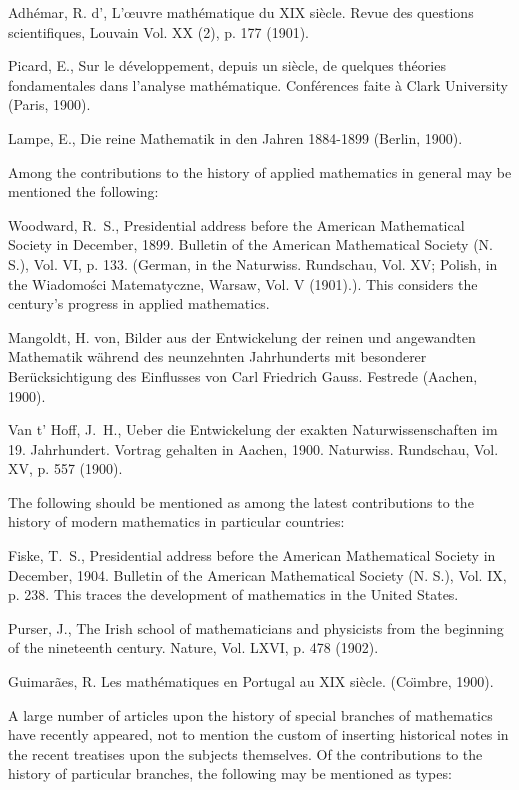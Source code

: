 \documentclass[oneside]{book}
\begin{document}
{Adh\'emar, R. d', L'\oe{}uvre math\'ematique du XIX si\`ecle. Revue
des questions scientifiques, Louvain Vol. XX (2), p. 177 (1901).

Picard, E., Sur le d\'eveloppement, depuis un si\`ecle, de quelques
th\'eories fondamentales dans l'analyse
math\'ematique. Conf\'erences faite \`a Clark University (Paris,
1900).

Lampe, E., Die reine Mathematik in den Jahren 1884-1899 (Berlin,
1900).

\bigskip

Among the contributions to the history of applied mathematics in
general may be mentioned the following:

\bigskip

Woodward, R.~S., Presidential address before the American
Mathematical Society in December, 1899. Bulletin of the American
Mathematical Society (N. S.), Vol. VI, p. 133. (German, in the
Naturwiss. Rundschau, Vol. XV; Polish, in the Wiadomo\'sci
Matematyczne, Warsaw, Vol. V (1901).). This considers the century's
progress in applied mathematics.

Mangoldt, H. von, Bilder aus der Entwickelung der reinen und
angewandten Mathematik w\"ahrend des neunzehnten Jahrhunderts mit
besonderer Ber\"ucksichtigung des Einflusses von Carl Friedrich
Gauss. Festrede (Aachen, 1900).

Van t' Hoff, J.~H., Ueber die Entwickelung der exakten
Naturwissenschaften im 19. Jahrhundert. Vortrag gehalten in Aachen,
1900. Naturwiss. Rundschau, Vol. XV, p. 557 (1900).

\bigskip

The following should be mentioned as among the latest contributions
to the history of modern mathematics in particular countries:

\bigskip

Fiske, T.~S., Presidential address before the American Mathematical
Society in December, 1904. Bulletin of the American Mathematical
Society (N. S.), Vol. IX, p. 238. This traces the development of
mathematics in the United States.

Purser, J., The Irish school of mathematicians and physicists from
the beginning of the nineteenth century. Nature, Vol. LXVI, p. 478
(1902).

Guimar\~aes, R. Les math\'ematiques en Portugal au XIX si\`ecle.
(Co\"{\i}mbre, 1900).

\bigskip

A large number of articles upon the history of special branches of
mathematics have recently appeared, not to mention the custom of
inserting historical notes in the recent treatises upon the subjects
themselves. Of the contributions to the history of particular
branches, the following may be mentioned as types:

}
\end{document}
